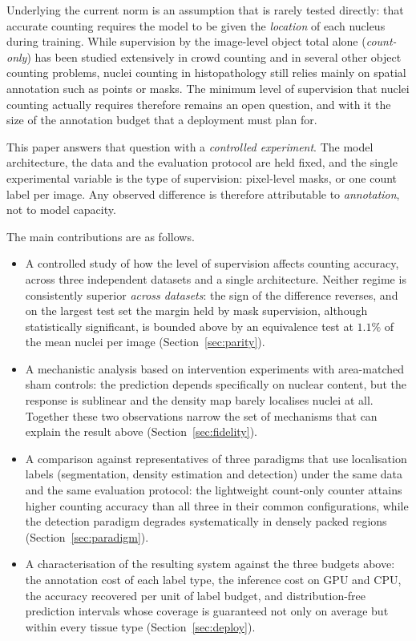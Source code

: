 \documentclass[preprint,12pt]{elsarticle}
\begin{document}
Underlying the current norm is an assumption that is rarely tested directly: that accurate counting requires the
model to be given the \emph{location} of each nucleus during training. While supervision by the image-level
object total alone (\emph{count-only}) has been studied extensively in crowd counting and in several other
object counting problems, nuclei counting in histopathology still relies mainly on spatial annotation such as
points or masks. The minimum level of supervision that nuclei counting actually requires therefore remains an
open question, and with it the size of the annotation budget that a deployment must plan for.

This paper answers that question with a \emph{controlled experiment}. The model architecture, the data and the
evaluation protocol are held fixed, and the single experimental variable is the type of supervision:
pixel-level masks, or one count label per image. Any observed difference is therefore attributable to
\emph{annotation}, not to model capacity. %

The main contributions are as follows.
\begin{itemize}
\item A controlled study of how the level of supervision affects counting accuracy, across three independent
datasets and a single architecture. Neither regime is consistently superior \emph{across datasets}: the sign of
the difference reverses, and on the largest test set the margin held by mask supervision, although
statistically significant, is bounded above by an equivalence test at $1.1\%$ of the mean nuclei per image
(Section~\ref{sec:parity}).
\item A mechanistic analysis based on intervention experiments with area-matched sham controls: the prediction
depends specifically on nuclear content, but the response is sublinear and the density map barely localises
nuclei at all. Together these two observations narrow the set of mechanisms that can explain the result above
(Section~\ref{sec:fidelity}).
\item A comparison against representatives of three paradigms that use localisation labels (segmentation,
density estimation and detection) under the same data and the same evaluation protocol: the lightweight
count-only counter attains higher counting accuracy than all three in their common configurations, while the
detection paradigm degrades systematically in densely packed regions (Section~\ref{sec:paradigm}).
\item A characterisation of the resulting system against the three budgets above: the annotation cost of each
label type, the inference cost on GPU and CPU, the accuracy recovered per unit of label budget, and
distribution-free prediction intervals whose coverage is guaranteed not only on average but within every
tissue type (Section~\ref{sec:deploy}).
\end{itemize}
\end{document}
